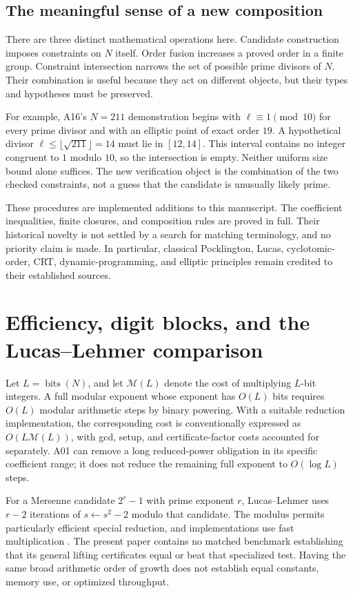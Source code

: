 \documentclass[11pt,a4paper]{article}
\theoremstyle{definition}\newtheorem{definition}[theorem]{Definition}
\theoremstyle{remark}\newtheorem{remark}[theorem]{Remark}
\newcommand{\bits}{\operatorname{bits}}\newcommand{\Norm}{\operatorname{N}}
\begin{document}
\subsection{The meaningful sense of a new composition}

There are three distinct mathematical operations here. Candidate
construction imposes constraints on $N$ itself. Order fusion increases a
proved order in a finite group. Constraint intersection narrows the set
of possible prime divisors of $N$. Their combination is useful because
they act on different objects, but their types and hypotheses must be
preserved.

For example, A16's $N=211$ demonstration begins with
$\ell\equiv1\pmod{10}$ for every prime divisor and with an elliptic point
of exact order $19$. A hypothetical divisor
$\ell\le\lfloor\sqrt{211}\rfloor=14$ must lie in $[12,14]$.
This interval contains no integer congruent to $1$ modulo $10$, so the
intersection is empty. Neither uniform size bound alone suffices.
The new verification object is the combination of the two checked
constraints, not a guess that the candidate is unusually likely prime.

These procedures are implemented additions to this manuscript.
The coefficient inequalities, finite closures, and composition rules
are proved in full. Their historical novelty is not settled by a search
for matching terminology, and no priority claim is made. In particular,
classical Pocklington, Lucas, cyclotomic-order, CRT, dynamic-programming,
and elliptic principles remain credited to their established sources.

\section{Efficiency, digit blocks, and the Lucas--Lehmer comparison}
\label{sec:revision-efficiency}

Let $L=\bits(N)$, and let $\mathcal M(L)$ denote the cost of multiplying
$L$-bit integers. A full modular exponent whose exponent has $O(L)$ bits
requires $O(L)$ modular arithmetic steps by binary powering. With a
suitable reduction implementation, the corresponding cost is conventionally
expressed as $O(L\mathcal M(L))$, with gcd, setup, and certificate-factor
costs accounted for separately. A01 can remove a long reduced-power
obligation in its specific coefficient range; it does not reduce the
remaining full exponent to $O(\log L)$ steps.

For a Mersenne candidate $2^r-1$ with prime exponent $r$, Lucas--Lehmer
uses $r-2$ iterations of $s\leftarrow s^2-2$ modulo that candidate.
The modulus permits particularly efficient special reduction, and
implementations use fast multiplication \cite{revision-gimps-math}.
The present paper contains no matched benchmark establishing that its
general lifting certificates equal or beat that specialized test.
Having the same broad arithmetic order of growth does not establish
equal constants, memory use, or optimized throughput.
\end{document}

